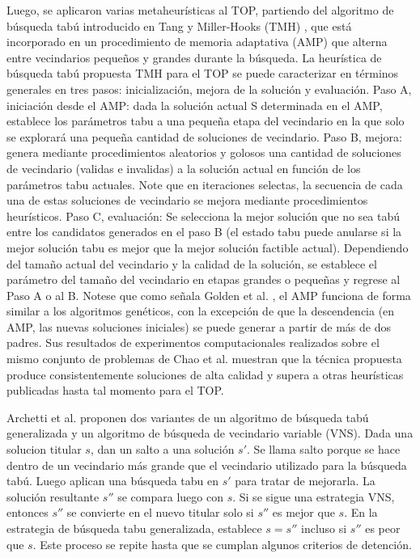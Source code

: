 \bigskip

Luego, se aplicaron varias metaheurísticas al TOP, partiendo del algoritmo de búsqueda tabú introducido en Tang y Miller-Hooks (TMH) \cite{TangMillerHooks}, que está incorporado en un procedimiento de memoria adaptativa (AMP) que alterna entre vecindarios pequeños y grandes durante la búsqueda. La heurística de búsqueda tabú propuesta TMH para el TOP se puede caracterizar en términos generales en tres pasos: inicialización, mejora de la solución y evaluación. Paso A, iniciación desde el AMP: dada la solución actual S determinada en el AMP, establece los parámetros tabu a una pequeña etapa del vecindario en la que solo se explorará una pequeña cantidad de soluciones de vecindario. Paso B, mejora: genera mediante procedimientos aleatorios y golosos una cantidad de soluciones de vecindario (validas e invalidas) a la solución actual en función de los parámetros tabu actuales. Note que en iteraciones selectas, la secuencia de cada una de estas soluciones de vecindario se mejora mediante procedimientos heurísticos. Paso C, evaluación: Se selecciona la mejor solución que no sea tabú entre los candidatos generados en el paso B (el estado tabu puede anularse si la mejor solución tabu es mejor que la mejor solución factible actual). Dependiendo del tamaño actual del vecindario y la calidad de la solución, se establece el parámetro del tamaño del vecindario en etapas grandes o pequeñas y regrese al Paso A o al B. Notese que como señala Golden et al. \cite{GoldenLaporteTaillard}, el AMP funciona de forma similar a los algoritmos genéticos, con la excepción de que la descendencia (en AMP, las nuevas soluciones iniciales) se puede generar a partir de más de dos padres. Sus resultados de experimentos computacionales realizados sobre el mismo conjunto de problemas de Chao et al. muestran que la técnica propuesta produce consistentemente soluciones de alta calidad y supera a otras heurísticas publicadas hasta tal momento para el TOP.

\bigskip

Archetti et al. \cite{ArchettiHertzSperanza} proponen dos variantes de un algoritmo de búsqueda tabú generalizada y un algoritmo de búsqueda de vecindario variable (VNS). Dada una solucion titular $s$, dan un salto a una solución $s'$. Se llama salto porque se hace dentro de un vecindario más grande que el vecindario utilizado para la búsqueda tabú. Luego aplican una búsqueda tabu en $s'$ para tratar de mejorarla. La solución resultante $s''$ se compara luego con $s$. Si se sigue una estrategia VNS, entonces $s''$ se convierte en el nuevo titular solo si $s''$ es mejor que $s$. En la estrategia de búsqueda tabu generalizada, establece $s = s''$ incluso si $s''$ es peor que $s$. Este proceso se repite hasta que se cumplan algunos criterios de detención.

